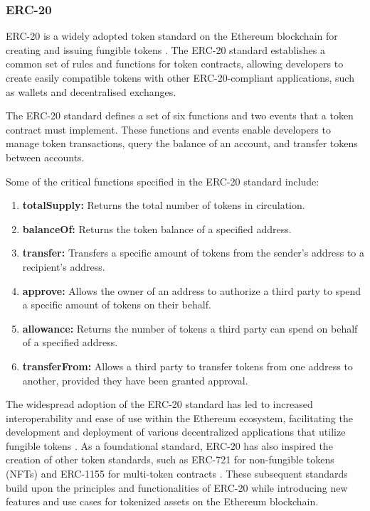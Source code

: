 \subsubsection{ERC-20}
ERC-20 is a widely adopted token standard on the Ethereum blockchain for creating and issuing fungible tokens \cite{vogelsteller2015erc20}. The ERC-20 standard establishes a common set of rules and functions for token contracts, allowing developers to create easily compatible tokens with other ERC-20-compliant applications, such as wallets and decentralised exchanges.

The ERC-20 standard defines a set of six functions and two events that a token contract must implement. These functions and events enable developers to manage token transactions, query the balance of an account, and transfer tokens between accounts.

Some of the critical functions specified in the ERC-20 standard include:
\begin{enumerate}
\item	\textbf{totalSupply:} Returns the total number of tokens in circulation.
\item	\textbf{balanceOf:} Returns the token balance of a specified address.
\item	\textbf{transfer:} Transfers a specific amount of tokens from the sender's address to a recipient's address.
\item	\textbf{approve:} Allows the owner of an address to authorize a third party to spend a specific amount of tokens on their behalf.
\item	\textbf{allowance:} Returns the number of tokens a third party can spend on behalf of a specified address.
\item	\textbf{transferFrom:} Allows a third party to transfer tokens from one address to another, provided they have been granted approval.
\end{enumerate}

The widespread adoption of the ERC-20 standard has led to increased interoperability and ease of use within the Ethereum ecosystem, facilitating the development and deployment of various decentralized applications that utilize fungible tokens \cite{vogelsteller2015erc20}. As a foundational standard, ERC-20 has also inspired the creation of other token standards, such as ERC-721 for non-fungible tokens (NFTs) \cite{entriken2018erc721} and ERC-1155 for multi-token contracts \cite{eip2018eip1155}. These subsequent standards build upon the principles and functionalities of ERC-20 while introducing new features and use cases for tokenized assets on the Ethereum blockchain.

